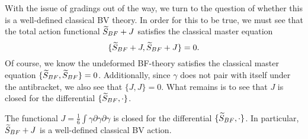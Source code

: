 \documentclass[11pt]{amsart}
\begin{document}
With the issue of gradings out of the way, we turn to the question of whether this is a well-defined classical BV theory.
In order for this to be true, we must see that the total action functional $\Tilde{S}_{BF} + J$ satisfies the classical master equation
\[
  \{\Tilde{S}_{BF} + J , \Tilde{S}_{BF} + J\} = 0 .
\]
Of course, we know the undeformed BF-theory satisfies the classical master equation $\{\Tilde{S}_{BF}, \Tilde{S}_{BF}\} = 0$.
Additionally, since $\gamma$ does not pair with itself under the antibracket, we also see that $\{J,J\}=0$.
What remains is to see that $J$ is closed for the differential $\{\Tilde{S}_{BF}, \cdot\}$.

\begin{lem}
The functional $J = \frac16\int \gamma \partial \gamma \partial \gamma$ is closed for the differential $\{\Tilde{S}_{BF},\cdot\}$.
In particular, $\Tilde{S}_{BF} + J$ is a well-defined classical BV action.
\end{lem}
\end{document}
